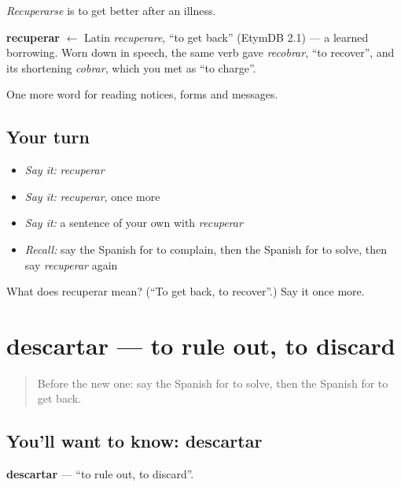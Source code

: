 \emph{Recuperarse} is to get better after an illness.

\begin{cousinweb}
\textbf{recuperar} $\leftarrow$ Latin \emph{recuperare}, \textquotedblleft{}to get back\textquotedblright{} (EtymDB 2.1) — a learned borrowing. Worn down in speech, the same verb gave \emph{recobrar}, \textquotedblleft{}to recover\textquotedblright{}, and its shortening \emph{cobrar}, which you met as \textquotedblleft{}to charge\textquotedblright{}.
\end{cousinweb}

\begin{grammarlens}[title={What you've built}]
One more word for reading notices, forms and messages.
\end{grammarlens}

\subsection*{Your turn}
\begin{itemize}
\raggedright
  \item \emph{Say it:} \emph{recuperar}
  \item \emph{Say it:} \emph{recuperar}, once more
  \item \emph{Say it:} a sentence of your own with \emph{recuperar}
  \item \emph{Recall:} say the Spanish for to complain, then the Spanish for to solve, then say \emph{recuperar} again
\end{itemize}

\begin{tcolorbox}[breakable,colback=teal!4,colframe=teal!35!black,title={Before you move on}]
What does recuperar mean? (\textquotedblleft{}To get back, to recover\textquotedblright{}.) Say it once more.
\end{tcolorbox}
\section[descartar]{descartar — to rule out, to discard}

\label{lesson:ES-C481-descartar}



\begin{quote}
Before the new one: say the Spanish for to solve, then the Spanish for to get back.
\end{quote}

\subsection*{You'll want to know: descartar}
\textbf{descartar} — \textquotedblleft{}to rule out, to discard\textquotedblright{}.

